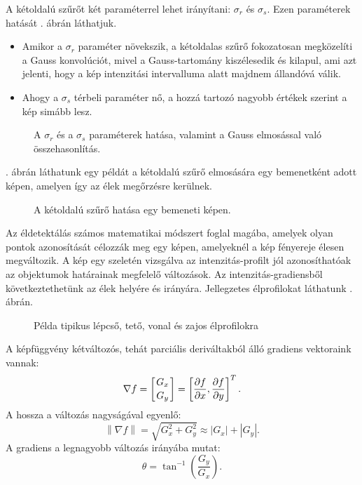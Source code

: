 A kétoldalú szűrőt két paraméterrel lehet irányítani: $\sigma_r$ és $\sigma_s$. Ezen paraméterek hatását . ábrán láthatjuk.
\begin{itemize}
\item Amikor a $\sigma_r$ paraméter növekszik, a kétoldalas szűrő fokozatosan megközelíti a Gauss konvolúciót, mivel a Gauss-tartomány kiszélesedik és kilapul, ami azt jelenti, hogy a kép intenzitási intervalluma alatt majdnem állandóvá válik.
\item Ahogy a $\sigma_s$ térbeli paraméter nő, a hozzá tartozó nagyobb értékek szerint a kép simább lesz.
\end{itemize}

\begin{figure}[h!]
\centering
{}
\caption{A $\sigma_r$ és a $\sigma_s$ paraméterek hatása, valamint a Gauss elmosással való összehasonlítás.} 
\label{fig:bilateral}
\end{figure}

. ábrán láthatunk egy példát a kétoldalú szűrő elmosására egy bemenetként adott képen, amelyen így az élek megőrzésre kerülnek.

\begin{figure}[h!]
\centering
{}
\caption{A kétoldalú szűrő hatása egy bemeneti képen.} 
\label{fig:bilateral1}
\end{figure}


\newpage


Az éldetektálás számos matematikai módszert foglal magába, amelyek olyan pontok azonosítását célozzák meg egy képen, amelyeknél a kép fényereje élesen megváltozik. A kép egy szeletén vizsgálva az intenzitás-profilt jól azonosíthatóak az objektumok határainak megfelelő változások. Az intenzitás-gradiensből következtethetünk az élek helyére és irányára. Jellegzetes élprofilokat láthatunk . ábrán.

\begin{figure}[h!]
\centering
{}
\caption{Példa tipikus lépcső, tető, vonal és zajos élprofilokra} 
\label{fig:elprofilok}
\end{figure}

A képfüggvény kétváltozós, tehát parciális deriváltakból álló gradiens vektoraink vannak: 
$$
\nabla f =
\left[ \genfrac{}{}{0pt}{}{G_x}{G_y} \right] =
\left[ \frac{\partial f}{\partial x}, \frac{\partial f}{\partial y}  \right]^{T}.$$
A hossza a változás nagyságával egyenlő: 
$$
\left\| \nabla f \right \| =
\sqrt{G_{x}^{2}+G_{y}^{2}} \approx
\left | G_x  \right |+\left | G_y  \right |.
$$
A gradiens a legnagyobb változás irányába mutat: 
$$
\theta = \tan^{-1}\left(\frac{G_y}{G_x}\right).
$$

